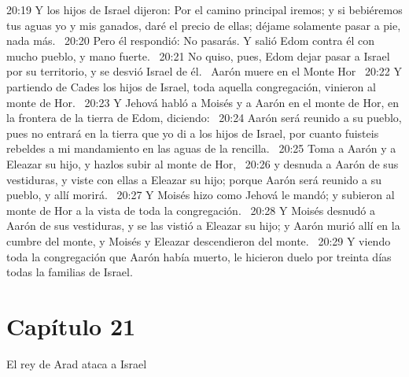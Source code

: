 20:19 Y los hijos de Israel dijeron: Por el camino principal iremos; y si bebiéremos tus aguas yo y mis ganados, daré el precio de ellas; déjame solamente pasar a pie, nada más.  
20:20 Pero él respondió: No pasarás. Y salió Edom contra él con mucho pueblo, y mano fuerte.  
20:21 No quiso, pues, Edom dejar pasar a Israel por su territorio, y se desvió Israel de él.  
Aarón muere en el Monte Hor  
20:22 Y partiendo de Cades los hijos de Israel, toda aquella congregación, vinieron al monte de Hor.  
20:23 Y Jehová habló a Moisés y a Aarón en el monte de Hor, en la frontera de la tierra de Edom, diciendo:  
20:24 Aarón será reunido a su pueblo, pues no entrará en la tierra que yo di a los hijos de Israel, por cuanto fuisteis rebeldes a mi mandamiento en las aguas de la rencilla.  
20:25 Toma a Aarón y a Eleazar su hijo, y hazlos subir al monte de Hor,  
20:26 y desnuda a Aarón de sus vestiduras, y viste con ellas a Eleazar su hijo; porque Aarón será reunido a su pueblo, y allí morirá.  
20:27 Y Moisés hizo como Jehová le mandó; y subieron al monte de Hor a la vista de toda la congregación.  
20:28 Y Moisés desnudó a Aarón de sus vestiduras, y se las vistió a Eleazar su hijo; y Aarón murió allí en la cumbre del monte, y Moisés y Eleazar descendieron del monte.  
20:29 Y viendo toda la congregación que Aarón había muerto, le hicieron duelo por treinta días todas la familias de Israel.  
\section*{Capítulo 21 }
El rey de Arad ataca a Israel  

